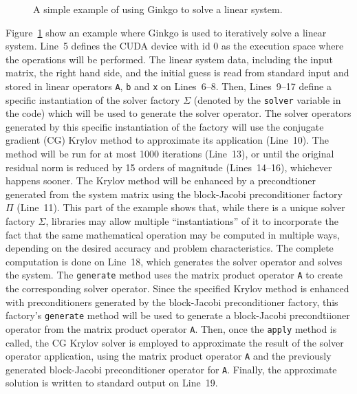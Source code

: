 \begin{figure}
\begin{center}

\end{center}
\caption{A simple example of using Ginkgo to solve a linear system.}
\label{conclusion:fig:ginkgo-example}
\end{figure}

Figure~\ref{conclusion:fig:ginkgo-example} show an example where Ginkgo is used
to iteratively solve a linear system. Line~5 defines the CUDA device with id 0
as the execution space where the operations will be performed. The linear system
data, including the input matrix, the right hand side, and the initial guess is
read from standard input and stored in linear operators \texttt{A}, \texttt{b}
and \texttt{x} on Lines~6--8. Then, Lines~9--17 define a specific instantiation
of the solver factory $\Sigma$ (denoted by the \texttt{solver} variable in the
code) which will be used to generate the solver operator. The solver operators
generated by this specific instantiation of the factory will use the conjugate
gradient (CG) Krylov method to approximate its application (Line~10). The method
will be run for at most 1000 iterations (Line~13), or until the original
residual norm is reduced by 15 orders of magnitude (Lines~14--16), whichever
happens sooner. The Krylov method will be enhanced by a precondtioner generated
from the system matrix using the block-Jacobi preconditioner factory $\Pi$
(Line~11). This part of the example shows that, while there is a unique solver
factory $\Sigma$, libraries may allow multiple ``instantiations'' of it to
incorporate the fact that the same mathematical operation may be computed in
multiple ways, depending on the desired accuracy and problem characteristics.
The complete computation is done on Line~18, which generates the solver operator
and solves the system. The \texttt{generate} method uses the matrix product
operator \texttt{A} to create the corresponding solver operator.
Since the specified Krylov method is enhanced with preconditioners generated
by the block-Jacobi preconditioner factory, this factory's \texttt{generate}
method will be used to generate a block-Jacobi precondtiioner operator from the
matrix product operator \texttt{A}. Then, once the \texttt{apply} method is
called, the CG Krylov solver is employed to approximate the result of the solver
operator application, using the matrix product operator \texttt{A} and the
previously generated block-Jacobi preconditioner operator for \texttt{A}.
Finally, the approximate solution is written to standard output on Line~19.
